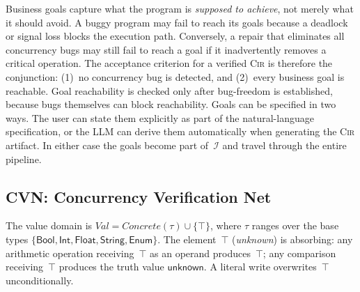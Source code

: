 Business goals capture what the program is \emph{supposed to achieve}, not merely what it should avoid. A buggy program may fail to reach its goals because a deadlock or signal loss blocks the execution path. Conversely, a repair that eliminates all concurrency bugs may still fail to reach a goal if it inadvertently removes a critical operation. The acceptance criterion for a verified \textsc{Cir} is therefore the conjunction: (1)~no concurrency bug is detected, and (2)~every business goal is reachable. Goal reachability is checked only after bug-freedom is established, because bugs themselves can block reachability. Goals can be specified in two ways. The user can state them explicitly as part of the natural-language specification, or the LLM can derive them automatically when generating the \textsc{Cir} artifact. In either case the goals become part of~$\mathcal{I}$ and travel through the entire pipeline.


\subsection{CVN: Concurrency Verification Net}
\label{subsec:cvn-def}

\begin{definition}
\label{def:val}
The value domain is $\mathit{Val}=\mathit{Concrete}(\tau)\cup\{\top\}$, where $\tau$ ranges over the base types $\{\textsf{Bool},\textsf{Int},\textsf{Float},\textsf{String},\textsf{Enum}\}$. The element~$\top$ (\emph{unknown}) is absorbing: any arithmetic operation receiving~$\top$ as an operand produces~$\top$; any comparison receiving~$\top$ produces the truth value $\mathsf{unknown}$. A literal write overwrites~$\top$ unconditionally.
\end{definition}


